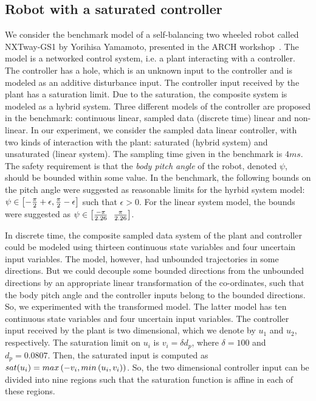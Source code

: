 \subsection{Robot with a saturated controller}   We consider the benchmark
model of a self-balancing two wheeled robot called NXTway-GS1 by
Yorihisa Yamamoto, presented in the ARCH workshop~\cite{TODO}.  The
model is a networked control system, i.e. a plant interacting with a
controller.  The controller has a hole, which is an unknown input to
the controller and is modeled as an additive disturbance input.  The
controller input received by the plant has a saturation limit.  Due to
the saturation, the composite system is modeled as a hybrid system.
Three different models of the controller are proposed in the
benchmark: continuous linear, sampled data (discrete time) linear and
non-linear.  In our experiment, we consider the sampled data linear
controller, with two kinds of interaction with the plant: saturated
(hybrid system) and unsaturated (linear system).  The sampling
time given in the benchmark is $4 ms$.  The safety requirement is that
the \emph{body pitch angle} of the robot, denoted $\psi$, should be
bounded within some value. In the benchmark, the following bounds on
the pitch angle were suggested as reasonable limits for the hyrbid
system model:
$\psi\in\left[-\frac{\pi}{2}+\epsilon,\frac{\pi}{2}-\epsilon\right]$ such
that $\epsilon>0$.  For the linear system model, the bounds were
suggested as $\psi\in\left[\frac{-\pi}{2.26}~~\frac{\pi}{2.26}\right]$.

In discrete time, the composite sampled data system of the plant and
controller could be modeled using thirteen continuous state variables
and four uncertain input variables.  The model, however, had unbounded
trajectories in some directions.  But we could decouple some bounded
directions from the unbounded directions by an appropriate linear
transformation of the co-ordinates, such that the body pitch angle and
the controller inputs belong to the bounded directions.  So, we
experimented with the transformed model.  The latter model has ten
continuous state variables and four uncertain input variables. The
controller input received by the plant is two dimensional, which we
denote by $u_1$ and $u_2$, respectively.  The saturation limit on
$u_i$ is $v_i=\delta d_p$, where $\delta=100$ and $d_p=0.0807$.  Then,
the saturated input is computed as $sat(u_i) =
max\left(-v_i,min\left(u_i,v_i\right)\right)$.  So, the two dimensional
controller input can be divided into nine regions such that the
saturation function is affine in each of these regions.

